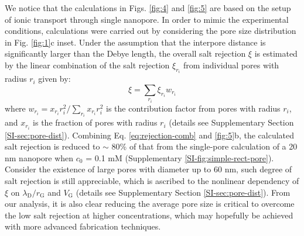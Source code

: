 {
We notice that the calculations in Figs. \ref{fig:4} and \ref{fig:5} 
are based on the setup  of ionic transport through single nanopore.
In order to mimic the experimental conditions, 
calculations were carried out by considering the pore size distribution in Fig. \ref{fig:1}c inset. 
Under the assumption that the interpore distance is significantly larger than the Debye length,
the overall salt rejection $\xi$ is
estimated by the linear combination of the salt rejection 
$\xi_{r_i}$ 
from individual pores with radius $r_i$ given by:
\begin{equation}
\label{eq:rejection-comb}
\xi = \sum_{r_{i}} \xi_{r_{i}} w_{r_{i}}
\end{equation}
where
$w_{r_{i}} = x_{r_{i}} r_{i}^{2} / \sum_{r_{i}} x_{r_{i}} r_{i}^{2} $
is the contribution factor from pores with radius $r_{i}$, and
$x_{r_{i}}$ is the fraction of pores with radius $r_{i}$ (details see
Supplementary Section \ref{SI-sec:pore-dist}). Combining
Eq. \ref{eq:rejection-comb} and \Fig{} \ref{fig:5}b, the calculated
salt rejection is reduced to $\sim{}$ 80\% of that from the
single-pore calculation of a 20 nm nanopore when $c_{0}$ = 0.1 mM
(Supplementary \Fig{} \ref{SI-fig:simple-rect-pore}). Consider the
existence of large pores with diameter up to 60 nm, such degree of
salt rejection is still appreciable, which is ascribed to the
nonlinear dependency of $\xi$ on
$\lambda_{\mathrm{D}} / r_{\mathrm{G}}$ and $V_{\mathrm{G}}$ (details
see Supplementary Section \ref{SI-sec:pore-dist}).}  From our
analysis, it is also clear reducing the average pore size is critical
to overcome the low salt rejection at higher concentrations, which may
hopefully be achieved with more advanced fabrication techniques.



